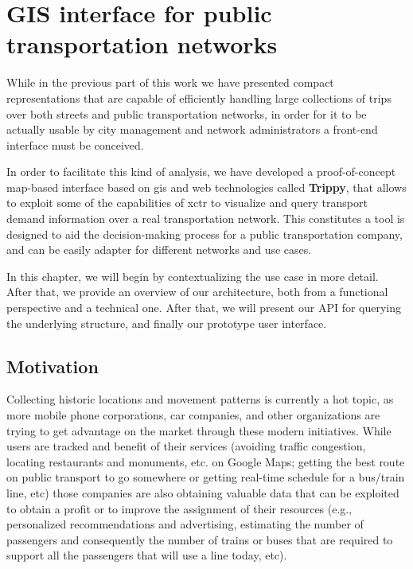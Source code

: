 \chapter{GIS interface for public transportation networks}
\label{sec:gis}
	While in the previous part of this work we have presented compact representations that are capable of efficiently handling large collections of trips over both streets and public transportation networks, in order for it to be actually usable by city management and network administrators a front-end interface must be conceived.
	
	In order to facilitate this kind of analysis, we have developed a proof-of-concept map-based interface based on \gls{gis} and web technologies called \textbf{Trippy}, that allows to exploit some of the capabilities of \gls{xctr} to visualize and query transport demand information over a real transportation network. This constitutes a tool is designed to aid the decision-making process for a public transportation company, and can be easily adapter for different networks and use cases.
	
	In this chapter, we will begin by contextualizing the use case in more detail. After that, we provide an overview of our architecture, both from a functional perspective and a technical one. After that, we will present our API for querying the underlying structure, and finally our prototype user interface.
	
	\section{Motivation}
	\label{sec:gis:intro}
    Collecting historic locations and movement patterns is currently a hot topic, as more mobile phone corporations, car companies, and other organizations are trying to get advantage on the market through these modern initiatives. While users are tracked and benefit of their services (avoiding traffic congestion, locating restaurants and monuments, etc. on Google Maps; getting the best route on public transport to go somewhere or getting real-time schedule for a bus/train line, etc) those companies are also obtaining valuable data that can be exploited to obtain a profit or to improve the assignment of their resources (e.g., personalized recommendations and advertising, estimating the number of passengers and consequently the number of trains or buses that are required to support all the passengers that will use a line today, etc).
    
